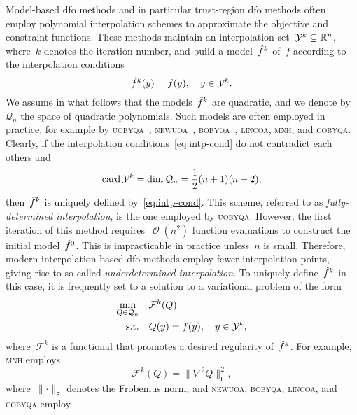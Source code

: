 \documentclass[draft]{article}
\numberwithin{equation}{section}
\theoremstyle{definition}
\theoremstyle{plain}
\DeclareMathOperator{\bigo}{\mathcal{O}}
\DeclareMathOperator{\card}{card}
\newcommand{\norm}[2][]{#1\lVert#2#1\rVert}
\newcommand{\obj}{f}
\newcommand{\objm}[1][]{\hat{\obj}\ifblank{#1}{}{^{#1}}}
\newcommand{\qpoly}{\mathcal{Q}_n}
\newcommand{\R}{\mathbb{R}}
\newcommand{\solvername}[1]{\textsc{#1}\xspace}
\newcommand{\xpt}[1][]{\mathcal{Y}\ifblank{#1}{}{^{#1}}}
\begin{document}
Model-based \gls{dfo} methods and in particular trust-region \gls{dfo} methods often employ polynomial interpolation schemes to approximate the objective and constraint functions.
These methods maintain an interpolation set~$\xpt[k] \subseteq \R^n$, where~$k$ denotes the iteration number, and build a model~$\objm[k]$ of~$\obj$ according to the interpolation conditions
\begin{equation}
    \label{eq:intp-cond}
    \objm[k](y) = \obj(y), \quad y \in \xpt[k].
\end{equation}
We assume in what follows that the models~$\objm[k]$ are quadratic, and we denote by~$\qpoly$ the space of quadratic polynomials.
Such models are often employed in practice, for example by \solvername{uobyqa}~\cite{Powell_2002}, \solvername{newuoa}~\cite{Powell_2006}, \solvername{bobyqa}~\cite{Powell_2009}, \solvername{lincoa}, \solvername{mnh}, and \solvername{cobyqa}.
Clearly, if the interpolation conditions~\eqref{eq:intp-cond} do not contradict each others and
\begin{equation*}
    \card\xpt[k] = \dim\qpoly = \frac{1}{2} (n + 1) (n + 2),
\end{equation*}
then~$\objm[k]$ is uniquely defined by~\eqref{eq:intp-cond}.
This scheme, referred to as \emph{fully-determined interpolation}, is the one employed by \solvername{uobyqa}.
However, the first iteration of this method requires~$\bigo(n^2)$ function evaluations to construct the initial model~$\objm[0]$.
This is impracticable in practice unless~$n$ is small.
Therefore, modern interpolation-based \gls{dfo} methods employ fewer interpolation points, giving rise to so-called \emph{underdetermined interpolation}.
To uniquely define~$\objm[k]$ in this case, it is frequently set to a solution to a variational problem of the form
\begin{equation}
    \label{eq:intp-var}
    \begin{aligned}
        \min_{Q \in \qpoly} & \quad \mathcal{F}^k(Q)\\
        \text{s.t.}         & \quad Q(y) = \obj(y), \quad y \in \xpt[k],
    \end{aligned}
\end{equation}
where~$\mathcal{F}^k$ is a functional that promotes a desired regularity of~$\objm[k]$.
For example, \solvername{mnh} employs
\begin{equation}
    \label{eq:mnh}
    \mathcal{F}^k(Q) = \norm[\big]{\nabla^2 Q}_{\mathsf{F}}^2,
\end{equation}
where~$\norm{\cdot}_{\mathsf{F}}$ denotes the Frobenius norm, and \solvername{newuoa}, \solvername{bobyqa}, \solvername{lincoa}, and \solvername{cobyqa} employ
\end{document}
